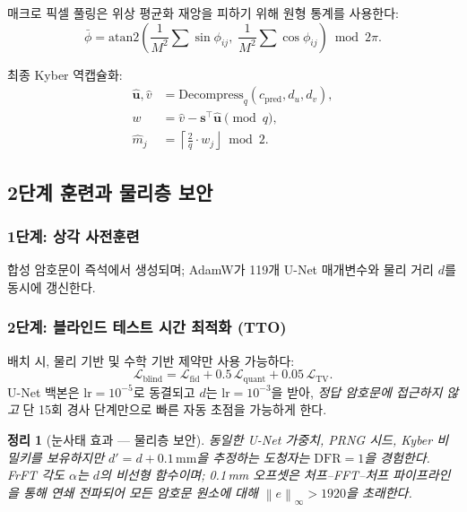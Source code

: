\documentclass[11pt, a4paper]{article}
\theoremstyle{definition}
\theoremstyle{plain}
\newtheorem{theorem}{정리}[section]
\newcommand{\norm}[1]{\left\|#1\right\|}
\newcommand{\ceil}[1]{\left\lceil#1\right\rfloor}
\begin{document}
매크로 픽셀 풀링은 위상 평균화 재앙을 피하기 위해 원형 통계를 사용한다:
\begin{equation}
  \bar{\phi} = \mathrm{atan2}\!\left(
    \frac{1}{M^2}\sum \sin\phi_{ij},\;
    \frac{1}{M^2}\sum \cos\phi_{ij}
  \right) \bmod 2\pi.
  \label{eq:circular_mean}
\end{equation}

최종 Kyber 역캡슐화:
\begin{align}
  \hat{\mathbf{u}}, \hat{v} &= \mathrm{Decompress}_q(c_{\mathrm{pred}},
  d_u, d_v), \label{eq:decompress_final}\\
  w &= \hat{v} - \mathbf{s}^\top\hat{\mathbf{u}} \pmod{q},
  \label{eq:inner_product}\\
  \hat{m}_j &= \ceil{\frac{2}{q} \cdot w_j} \bmod 2.
  \label{eq:decode_msg}
\end{align}


\subsection{2단계 훈련과 물리층 보안}
\label{sec:training}

\subsubsection{1단계: 상각 사전훈련}
합성 암호문이 즉석에서 생성되며; AdamW가 119개 U-Net 매개변수와 물리 거리 $d$를 동시에 갱신한다.

\subsubsection{2단계: 블라인드 테스트 시간 최적화 (TTO)}
배치 시, 물리 기반 및 수학 기반 제약만 사용 가능하다:
\begin{equation}
  \mathcal{L}_{\text{blind}} =
  \mathcal{L}_{\text{fid}} + 0.5\,\mathcal{L}_{\text{quant}} +
  0.05\,\mathcal{L}_{\text{TV}}.
  \label{eq:blind_loss}
\end{equation}
U-Net 백본은 $\mathrm{lr} = 10^{-5}$로 동결되고 $d$는 $\mathrm{lr} = 10^{-3}$을 받아, \textit{정답 암호문에 접근하지 않고} 단 15회 경사 단계만으로 빠른 자동 초점을 가능하게 한다.

\begin{theorem}[눈사태 효과 --- 물리층 보안]
\label{thm:avalanche}
동일한 U-Net 가중치, PRNG 시드, Kyber 비밀키를 보유하지만 $d' = d + 0.1\,\mathrm{mm}$을 추정하는 도청자는 $\mathrm{DFR} = 1$을 경험한다. FrFT 각도 $\alpha$는 $d$의 비선형 함수이며; 0.1\,mm 오프셋은 처프--FFT--처프 파이프라인을 통해 연쇄 전파되어 모든 암호문 원소에 대해 $\norm{e}_\infty > 1920$을 초래한다.
\end{theorem}
\end{document}
